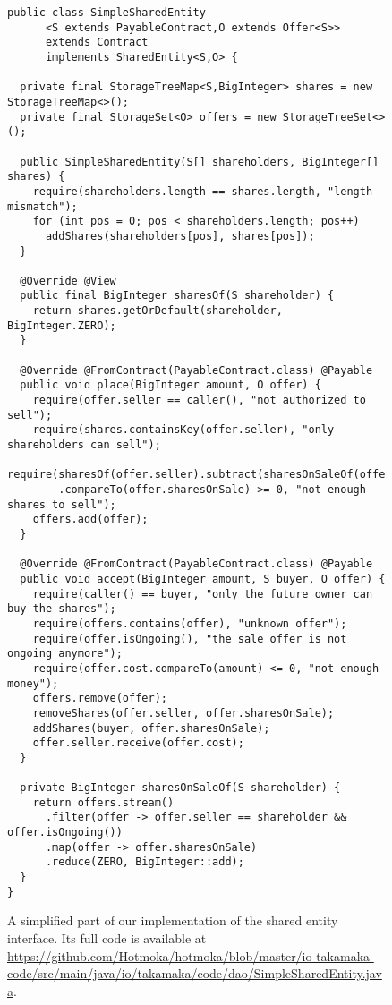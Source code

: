 \documentclass{llncs}
\begin{document}
\begin{figure}[htbp]
  \begin{center}
    \begin{lstlisting}[language=Takamaka]
public class SimpleSharedEntity
      <S extends PayableContract,O extends Offer<S>>
      extends Contract
      implements SharedEntity<S,O> {

  private final StorageTreeMap<S,BigInteger> shares = new StorageTreeMap<>();
  private final StorageSet<O> offers = new StorageTreeSet<>();        

  public SimpleSharedEntity(S[] shareholders, BigInteger[] shares) {
    require(shareholders.length == shares.length, "length mismatch");
    for (int pos = 0; pos < shareholders.length; pos++)
      addShares(shareholders[pos], shares[pos]);
  }

  @Override @View
  public final BigInteger sharesOf(S shareholder) {
    return shares.getOrDefault(shareholder, BigInteger.ZERO);
  }

  @Override @FromContract(PayableContract.class) @Payable
  public void place(BigInteger amount, O offer) {
    require(offer.seller == caller(), "not authorized to sell");
    require(shares.containsKey(offer.seller), "only shareholders can sell");
    require(sharesOf(offer.seller).subtract(sharesOnSaleOf(offer.seller))
        .compareTo(offer.sharesOnSale) >= 0, "not enough shares to sell");
    offers.add(offer);
  }

  @Override @FromContract(PayableContract.class) @Payable
  public void accept(BigInteger amount, S buyer, O offer) {
    require(caller() == buyer, "only the future owner can buy the shares");
    require(offers.contains(offer), "unknown offer");
    require(offer.isOngoing(), "the sale offer is not ongoing anymore");
    require(offer.cost.compareTo(amount) <= 0, "not enough money");
    offers.remove(offer);
    removeShares(offer.seller, offer.sharesOnSale);
    addShares(buyer, offer.sharesOnSale);
    offer.seller.receive(offer.cost);
  }

  private BigInteger sharesOnSaleOf(S shareholder) {
    return offers.stream()
      .filter(offer -> offer.seller == shareholder && offer.isOngoing())
      .map(offer -> offer.sharesOnSale)
      .reduce(ZERO, BigInteger::add);
  }
}
    \end{lstlisting}
  \end{center}
  \caption{A simplified part of our implementation of the shared entity interface.
  Its full code is available at \url{https://github.com/Hotmoka/hotmoka/blob/master/io-takamaka-code/src/main/java/io/takamaka/code/dao/SimpleSharedEntity.java}.}\label{fig:simple_shared_entity}
\end{figure}
\end{document}
